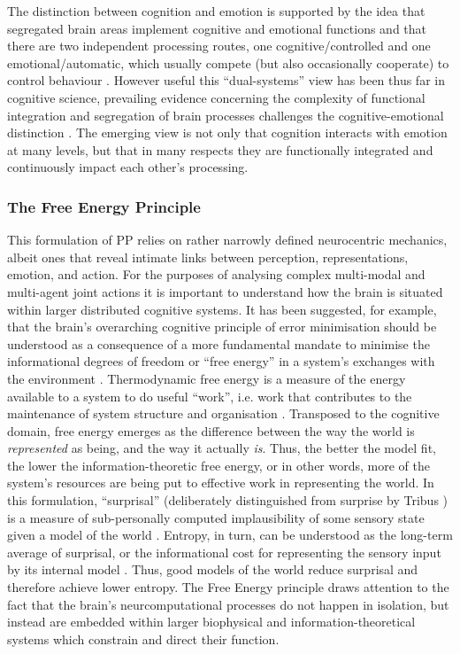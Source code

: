 \begin{CJK}{UTF8}{gbsn}
The distinction between cognition and emotion is supported by the idea that segregated brain areas implement cognitive and emotional functions and that there are two independent processing routes, one cognitive/controlled and one emotional/automatic, which usually compete (but also occasionally cooperate) to control behaviour \citep{Kahneman2003}.  However useful this ``dual-systems'' view has been thus far in cognitive science, prevailing evidence concerning the complexity of functional integration and segregation of brain processes challenges the cognitive-emotional distinction \citep{Pessoa2013}.  The emerging view is not only that cognition interacts with emotion at many levels, but that in many respects they are functionally integrated and continuously impact each other's processing.

\subsubsection{The Free Energy Principle}
This formulation of PP relies on rather narrowly defined neurocentric mechanics, albeit ones that reveal intimate links between perception, representations, emotion, and action.  For the purposes of analysing complex multi-modal and multi-agent joint actions it is important to understand how the brain is situated within larger distributed cognitive systems.  It has been suggested, for example, that the brain's overarching cognitive principle of error minimisation should be understood as a consequence of a more fundamental mandate to minimise the informational degrees of freedom or ``free energy'' in a system's exchanges with the environment \citep{Friston2010}.  Thermodynamic free energy is a measure of the energy available to a system to do useful ``work'', i.e. work that contributes to the maintenance of system structure and organisation \citep{Stoner2000}.
Transposed to the cognitive domain, free energy emerges as the difference between the way the world is \textit{represented} as being, and the way it actually \textit{is}.
Thus, the better the model fit, the lower the information-theoretic free energy, or in other words, more of the system's resources are being put to effective work in representing the world.  In this formulation, ``surprisal'' (deliberately distinguished from surprise by Tribus \textcite{Tribus1961}) is a measure of sub-personally computed implausibility of some sensory state given a model of the world \citep{Clark2013}.  Entropy, in turn, can be understood as the long-term average of surprisal, or the informational cost for representing the sensory input by its internal model \citep{Little2013}.  Thus, good models of the world reduce surprisal and therefore achieve lower entropy.  The Free Energy principle draws attention to the fact that the brain's neurcomputational processes do not happen in isolation, but instead are embedded within larger biophysical and information-theoretical systems which constrain and direct their function.


\end{CJK}
